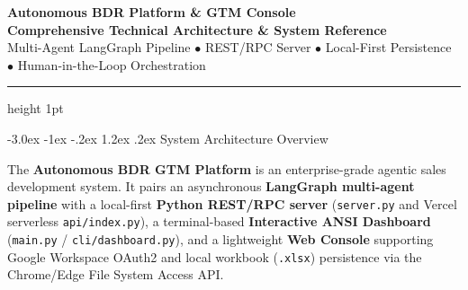 \documentclass[10pt,letterpaper]{article}
\makeatletter
\renewcommand{\section}{\@startsection{section}{1}{\z@}%
  {-3.0ex \@plus -1ex \@minus -.2ex}%
  {1.2ex \@plus .2ex}%
  {\normalfont\large\bfseries\color{branddark}}}
\makeatother
\begin{document}
\begin{center}
    {\LARGE\bfseries\color{branddark} Autonomous BDR Platform \& GTM Console}\\[4pt]
    {\normalsize\bfseries\color{brandblue} Comprehensive Technical Architecture \& System Reference}\\[4pt]
    {\small\color{brandgray} Multi-Agent LangGraph Pipeline $\bullet$ REST/RPC Server $\bullet$ Local-First Persistence $\bullet$ Human-in-the-Loop Orchestration}
\end{center}
\vspace{-2pt}
\hrule height 1pt
\vspace{8pt}

\section{System Architecture Overview}

The \textbf{Autonomous BDR GTM Platform} is an enterprise-grade agentic sales development system. It pairs an asynchronous \textbf{LangGraph multi-agent pipeline} with a local-first \textbf{Python REST/RPC server} (\texttt{server.py} and Vercel serverless \texttt{api/index.py}), a terminal-based \textbf{Interactive ANSI Dashboard} (\texttt{main.py} / \texttt{cli/dashboard.py}), and a lightweight \textbf{Web Console} supporting Google Workspace OAuth2 and local workbook (\texttt{.xlsx}) persistence via the Chrome/Edge File System Access API.
\end{document}
